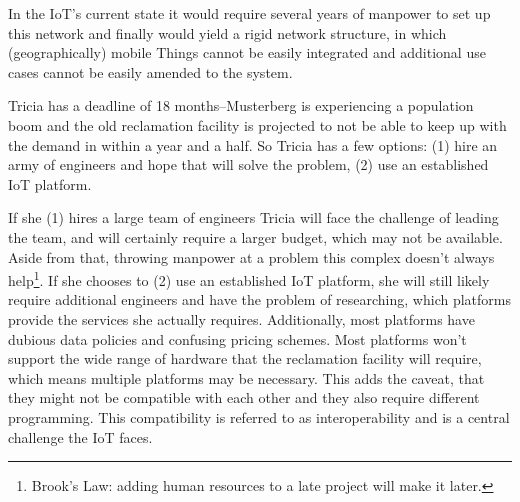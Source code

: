In the IoT's current state it would require several years of manpower to set up this network and finally would yield a rigid network structure, in which (geographically) mobile Things cannot be easily integrated and additional use cases cannot be easily amended to the system.

Tricia has a deadline of 18 months--Musterberg is experiencing a population boom and the old reclamation facility is projected to not be able to keep up with the demand in within a year and a half. So Tricia has a few options: (1) hire an army of engineers and hope that will solve the problem, (2) use an established IoT platform.

If she (1) hires a large team of engineers Tricia will face the challenge of leading the team, and will certainly require a larger budget, which may not be available. Aside from that, throwing manpower at a problem this complex doesn't always help\footnote{Brook's Law: adding human resources to a late project will make it later.}. If she chooses to (2) use an established IoT platform, she will still likely require additional engineers and have the problem of researching, which platforms provide the services she actually requires. Additionally, most platforms have dubious data policies and confusing pricing schemes. Most platforms won't support the wide range of hardware that the reclamation facility will require, which means multiple platforms may be necessary. This adds the caveat, that they might not be compatible with each other and they also require different programming. This compatibility is referred to as interoperability and is a central challenge the IoT faces.

